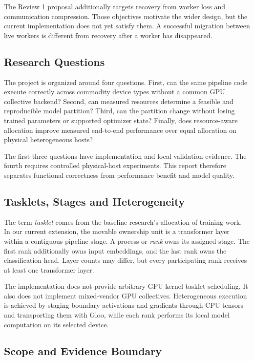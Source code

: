 The Review 1 proposal additionally targets recovery from worker loss and communication compression. Those objectives motivate the wider design, but the current implementation does not yet satisfy them. A successful migration between live workers is different from recovery after a worker has disappeared.

\subsection{Research Questions}

The project is organized around four questions. First, can the same pipeline code execute correctly across commodity device types without a common GPU collective backend? Second, can measured resources determine a feasible and reproducible model partition? Third, can the partition change without losing trained parameters or supported optimizer state? Finally, does resource-aware allocation improve measured end-to-end performance over equal allocation on physical heterogeneous hosts?

The first three questions have implementation and local validation evidence. The fourth requires controlled physical-host experiments. This report therefore separates functional correctness from performance benefit and model quality.

\subsection{Tasklets, Stages and Heterogeneity}

The term \textit{tasklet} comes from the baseline research's allocation of training work. In our current extension, the movable ownership unit is a transformer layer within a contiguous pipeline stage. A process or \textit{rank} owns its assigned stage. The first rank additionally owns input embeddings, and the last rank owns the classification head. Layer counts may differ, but every participating rank receives at least one transformer layer.

The implementation does not provide arbitrary GPU-kernel tasklet scheduling. It also does not implement mixed-vendor GPU collectives. Heterogeneous execution is achieved by staging boundary activations and gradients through CPU tensors and transporting them with Gloo, while each rank performs its local model computation on its selected device.

\subsection{Scope and Evidence Boundary}

